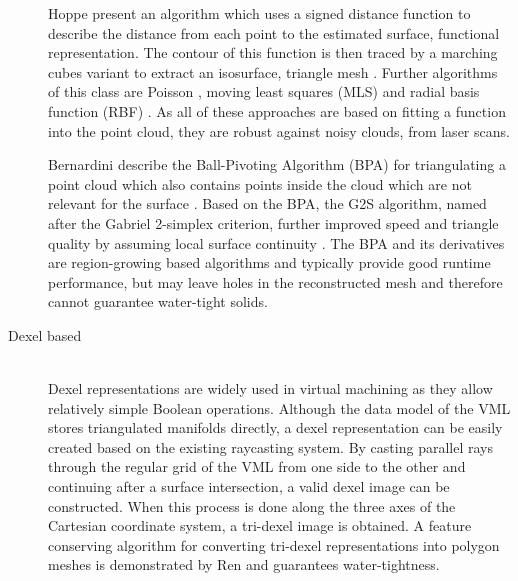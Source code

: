 \begin{description}
	Hoppe \etal present an algorithm which uses a signed distance function to describe the distance from each point to the estimated surface, \ie functional representation.
	The contour of this function is then traced by a marching cubes variant to extract an isosurface, \ie triangle mesh \cite{sdf_surface_reconstruction}.
	Further algorithms of this class are Poisson \cite{poisson}, moving least squares (MLS) \cite{mls} and radial basis function (RBF) \cite{rbf}.
	As all of these approaches are based on fitting a function into the point cloud, they are robust against noisy clouds, \eg from laser scans.

	Bernardini \etal describe the Ball-Pivoting Algorithm (BPA) for triangulating a point cloud which also contains points inside the cloud which are not relevant for the surface \cite{bpa}.
	Based on the BPA, the G2S algorithm, named after the Gabriel 2-simplex criterion, further improved speed and triangle quality by assuming local surface continuity \cite{g2s}.
	The BPA and its derivatives are region-growing based algorithms and typically provide good runtime performance, but may leave holes in the reconstructed mesh and therefore cannot guarantee water-tight solids.


	\item[Dexel based] \hfill \\
	Dexel representations are widely used in virtual machining as they allow relatively simple Boolean operations.
	Although the data model of the VML stores triangulated manifolds directly, a dexel representation can be easily created based on the existing raycasting system.
	By casting parallel rays through the regular grid of the VML from one side to the other and continuing after a surface intersection, a valid dexel image can be constructed.
	When this process is done along the three axes of the Cartesian coordinate system, a tri-dexel image is obtained.
	A feature conserving algorithm for converting tri-dexel representations into polygon meshes is demonstrated by Ren \etal \cite{tridexel_reconstruction} and guarantees water-tightness.



\end{description}
